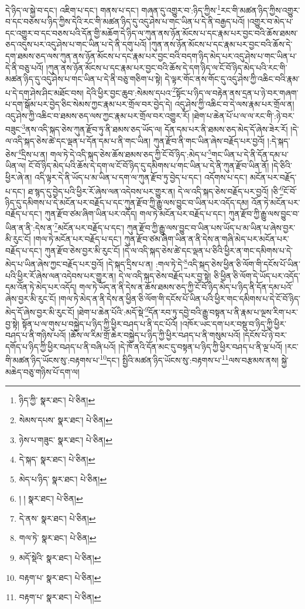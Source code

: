དེ་ཉིད་ལ་སྐྱེ་བ་དང་། འཇིག་པ་དང་། གནས་པ་དང་། གཞན་དུ་འགྱུར་བ་:ཉིད་ཀྱིས་\footnote{ཉིད་ཀྱི་  སྣར་ཐང་།  པེ་ཅིན། }རང་གི་མཚན་ཉིད་ཀྱིས་འགྱུར་བ་དང་བཅས་པ་ཉིད་ཀྱིས་དེའི་རང་གི་མཚན་ཉིད་དུ་འདུ་ཤེས་པ་གང་ཡིན་པ་དེ་ནི་བརྒྱད་པའོ། །འགྱུར་བ་མེད་པ་དང་འགྱུར་བ་དང་བཅས་པའི་དོན་གྱི་མཆོག་དེ་ཉིད་ལ་ཀུན་ནས་ཉོན་མོངས་པ་དང་རྣམ་པར་བྱང་བའི་ཆོས་ཐམས་ཅད་འདུས་པར་འདུ་ཤེས་པ་གང་ཡིན་པ་དེ་ནི་དགུ་པའོ། །ཀུན་ནས་ཉོན་མོངས་པ་དང་རྣམ་པར་བྱང་བའི་ཆོས་དེ་དག་ཐམས་ཅད་ལས་ཀུན་ནས་ཉོན་མོངས་པ་དང་རྣམ་པར་བྱང་བའི་བདག་ཉིད་མེད་པར་འདུ་ཤེས་པ་གང་ཡིན་པ་དེ་ནི་བཅུ་པའོ། །ཀུན་ནས་ཉོན་མོངས་པ་དང་རྣམ་པར་བྱང་བའི་ཆོས་དེ་དག་ཉིད་ལ་ངོ་བོ་ཉིད་མེད་པའི་རང་གི་མཚན་ཉིད་དུ་འདུ་ཤེས་པ་གང་ཡིན་པ་དེ་ནི་བཅུ་གཅིག་པ་སྟེ། དེ་ལྟར་གོང་ནས་གོང་དུ་འདུ་ཤེས་ཀྱི་འཆིང་བའི་རྣམ་པ་དེ་དག་ཤེས་ཤིང་མཐོང་བས། དེའི་ཕྱིར་བྱང་ཆུབ་:སེམས་དཔའ་\footnote{སེམས་དཔས་  སྣར་ཐང་།  པེ་ཅིན། }སྟོང་པ་ཉིད་ལ་བརྟེན་ནས་དྲན་པ་ཉེ་བར་གཞག་པ་དག་སྒོམ་པར་བྱེད་ཅིང་སེམས་ཀྱང་རྣམ་པར་གྲོལ་བར་བྱེད་དེ། འདུ་ཤེས་ཀྱི་འཆིང་བ་དེ་ལས་རྣམ་པར་གྲོལ་ན། འདུ་ཤེས་ཀྱི་འཆིང་བ་ཐམས་ཅད་ལས་ཀྱང་རྣམ་པར་གྲོལ་བར་འགྱུར་རོ། །ཐེག་པ་ཆེན་པོ་པ་ལ་ལ་རང་གི་:ཉེ་བར་བཟུང་\footnote{ཉེས་པ་གཟུང་  སྣར་ཐང་།  པེ་ཅིན། }ནས་འདི་སྐད་ཅེས་ཀུན་རྫོབ་ཏུ་ནི་ཐམས་ཅད་ཡོད་ལ། དོན་དམ་པར་ནི་ཐམས་ཅད་མེད་དོ་ཞེས་ཟེར་རོ། །དེ་ལ་འདི་སྐད་ཅེས་ཚེ་དང་ལྡན་པ་དོན་དམ་པ་ནི་གང་ཡིན། ཀུན་རྫོབ་ནི་གང་ཡིན་ཞེས་བརྗོད་པར་བྱའོ། །:དེ་སྐད་ཅེས་\footnote{དེ་སྐད་  སྣར་ཐང་།  པེ་ཅིན། }དྲིས་པ་ན། གལ་ཏེ་དེ་འདི་སྐད་ཅེས་ཆོས་ཐམས་ཅད་ཀྱི་ངོ་བོ་ཉིད་:མེད་པ་\footnote{མེད་པ་ཉིད་  སྣར་ཐང་།  པེ་ཅིན། }གང་ཡིན་པ་དེ་ནི་དོན་དམ་པ་ཡིན་ལ། ངོ་བོ་ཉིད་མེད་པའི་ཆོས་དེ་དག་ལ་ངོ་བོ་ཉིད་དུ་དམིགས་པ་གང་ཡིན་པ་དེ་ནི་ཀུན་རྫོབ་ཡིན་ནོ། །དེ་ཅིའི་ཕྱིར་ཞེ་ན། འདི་ལྟར་དེ་ནི་ཡོད་པ་མ་ཡིན་པ་དག་ལ་ཀུན་རྫོབ་ཏུ་བྱེད་པ་དང་། འདོགས་པ་དང་། མངོན་པར་བརྗོད་པ་དང་། ཐ་སྙད་དུ་བྱེད་པའི་ཕྱིར་རོ་ཞེས་ལན་འདེབས་པར་གྱུར་ན། དེ་ལ་འདི་སྐད་ཅེས་བརྗོད་པར་བྱའོ། །ཅི་\footnote{། །  སྣར་ཐང་།  པེ་ཅིན། }ངོ་བོ་ཉིད་དུ་དམིགས་པ་དེ་མངོན་པར་བརྗོད་པ་དང་ཀུན་རྫོབ་ཀྱི་རྒྱུ་ལས་བྱུང་བ་ཡིན་པར་འདོད་དམ། འོན་ཏེ་མངོན་པར་བརྗོད་པ་དང་། ཀུན་རྫོབ་ཙམ་ཞིག་ཡིན་པར་འདོད། གལ་ཏེ་མངོན་པར་བརྗོད་པ་དང་། ཀུན་རྫོབ་ཀྱི་རྒྱུ་ལས་བྱུང་བ་ཡིན་ན་ནི་:དེས་ན་\footnote{དེ་ནས་  སྣར་ཐང་།  པེ་ཅིན། }མངོན་པར་བརྗོད་པ་དང་། ཀུན་རྫོབ་ཀྱི་རྒྱུ་ལས་བྱུང་བ་ཡིན་པས་ཡོད་པ་མ་ཡིན་པ་ཞེས་བྱར་མི་རུང་ངོ། །གལ་ཏེ་མངོན་པར་བརྗོད་པ་དང་། ཀུན་རྫོབ་ཙམ་ཞིག་ཡིན་ན་ནི་དེས་ན་གཞི་མེད་པར་མངོན་པར་བརྗོད་པ་དང་། ཀུན་རྫོབ་ཅེས་བྱར་མི་རུང་ངོ། །དེ་ལ་འདི་སྐད་ཅེས་ཚེ་དང་ལྡན་པ་ཅིའི་ཕྱིར་ན་གང་དམིགས་པ་དེ་མེད་པ་ཡིན་ཞེས་ཀྱང་བརྗོད་པར་བྱའོ། །དེ་སྐད་དྲིས་པ་ན། :གལ་ཏེ་དེ་\footnote{གལ་ཏེ་  སྣར་ཐང་།  པེ་ཅིན། }འདི་སྐད་ཅེས་ཕྱིན་ཅི་ལོག་གི་དངོས་པོ་ཡིན་པའི་ཕྱིར་རོ་ཞེས་ལན་འདེབས་པར་གྱུར་ན། དེ་ལ་འདི་སྐད་ཅེས་བརྗོད་པར་བྱ་སྟེ། ཅི་ཕྱིན་ཅི་ལོག་དེ་ཡོད་པར་འདོད་དམ་འོན་ཏེ་མེད་པར་འདོད། གལ་ཏེ་ཡོད་ན་ནི་དེས་ན་ཆོས་ཐམས་ཅད་ཀྱི་ངོ་བོ་ཉིད་མེད་པ་ཉིད་ནི་དོན་དམ་པའོ་ཞེས་བྱར་མི་རུང་ངོ། །གལ་ཏེ་མེད་ན་ནི་དེས་ན་ཕྱིན་ཅི་ལོག་གི་དངོས་པོ་ཡིན་པའི་ཕྱིར་གང་དམིགས་པ་དེ་ངོ་བོ་ཉིད་མེད་དོ་ཞེས་བྱར་མི་རུང་ངོ། །ཐེག་པ་ཆེན་པོའི་:མདོ་སྡེ་\footnote{མདོ་སྡེའི་  སྣར་ཐང་།  པེ་ཅིན། }དོན་རབ་ཏུ་དབྱེ་བའི་རྒྱུ་བསྟན་པ་ནི་རྣམ་པ་ལྔས་རིག་པར་བྱ་སྟེ། སྟོན་པ་ལ་གུས་པ་བསྐྱེད་པ་ཉིད་ཀྱི་ཕྱིར་བཤད་པ་ནི་དང་པོའོ། །འཁོར་ཡང་དག་པར་བསྡུ་བ་ཉིད་ཀྱི་ཕྱིར་བཤད་པ་ནི་གཉིས་པའོ། །ཆོས་ལ་རིམ་གྲོ་ཆེར་བསྐྱེད་པ་ཉིད་ཀྱི་ཕྱིར་བཤད་པ་ནི་གསུམ་པའོ། །དངོས་པོ་ཉེ་བར་དགོད་པ་ཉིད་ཀྱི་ཕྱིར་བཤད་པ་ནི་བཞི་པའོ། །དེ་ཁོ་ནའི་དོན་མང་དུ་བསྟན་པ་ཉིད་ཀྱི་ཕྱིར་བཤད་པ་ནི་ལྔ་པའོ། །རང་གི་མཚན་ཉིད་ཡོངས་སུ་:བརྟགས་པ་\footnote{བརྟག་པ་  སྣར་ཐང་།  པེ་ཅིན། }དང་། སྤྱིའི་མཚན་ཉིད་ཡོངས་སུ་:བརྟགས་པ་\footnote{བརྟག་པ་  སྣར་ཐང་།  པེ་ཅིན། }ལས་བརྩམས་ནས། སྐྱེ་མཆེད་བཅུ་གཉིས་པོ་དག་ལ། 